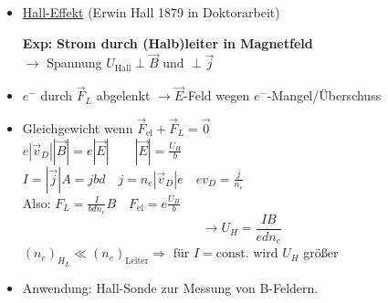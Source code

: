 \documentclass[titlepage,12pt,a4paper,ngerman]{report}
\newcommand{\tx}[1]{\textrm{#1}}
\begin{document}
\begin{itemize}
	\item \underline{Hall-Effekt} (Erwin Hall 1879 in Doktorarbeit)
	\item[\textbf{Exp:}] \textbf{Strom durch (Halb)leiter in Magnetfeld}\\
	$ \rightarrow $ Spannung $ U_{\tx{Hall}} \perp \vec{B} $ und $ \perp \vec{j} $
	\item $ e^- $ durch $ \vec{F}_L $ abgelenkt $ \rightarrow \vec{E} $-Feld wegen $ e^- $-Mangel/Überschuss
	\item Gleichgewicht wenn $ \vec{F}_{\tx{el}} + \vec{F}_L = \vec{0} $\\
	$ e | \vec{v}_D | | \vec{B} | = e | \vec{E}| \qquad | \vec{E} | = \frac{U_H}{b} $\\
	$ I = |\vec{j}| A = j b d   \quad j = n_e |\vec{v}_D| e \quad e v_D = \frac{j}{n_e}$\\
	Also: $ F_L = \frac{I}{b d n_e} B \quad F_{\tx{el}} = e \frac{U_H}{b} $\\
	$$ \rightarrow \boxed{U_H = \frac{IB}{e d n_e}}$$ $(n_e)_{H_L} \ll (n_e)_{\tx{Leiter}} \Rightarrow \tx{ für } I = \tx{const.}  $ wird $ U_H $ größer
	\item Anwendung: Hall-Sonde zur Messung von B-Feldern.
\end{itemize}
\end{document}
